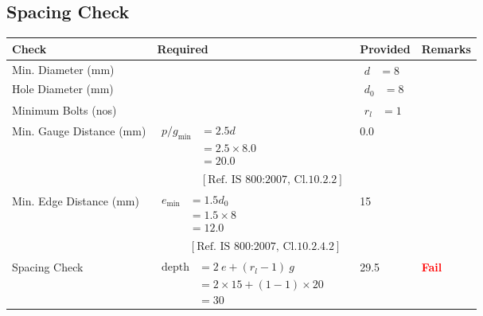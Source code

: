 \documentclass{article}%
\begin{document}
\subsection{Spacing Check}%
\label{subsec:SpacingCheck}%
\renewcommand{\arraystretch}{1.2}%
\begin{longtable}{|p{2.5cm}|p{7.5cm}|p{3cm}|p{2.5cm}|}%
\hline%
\rowcolor{OsdagGreen}%
Check&Required&Provided&Remarks\\%
\hline%
\endhead%
\hline%
Min. Diameter (mm)&&$\begin{aligned} d &=8 \end{aligned}$&\textcolor{OsdagGreen}{ 
\textbf{}
}\\%
\hline%
Hole Diameter (mm)& &$\begin{aligned} d_0 &=8 \end{aligned}$&\textcolor{OsdagGreen}{ 
\textbf{}
}\\%
\hline%
Minimum Bolts (nos)& &$\begin{aligned} r_l &=1 \end{aligned}$&\textcolor{OsdagGreen}{ 
\textbf{}
}\\%
\hline%
Min. Gauge Distance (mm)&$\begin{aligned} p/g_{\min}&= 2.5 d\\ &=2.5 \times8.0\\&=20.0\\ \\ & [\text{Ref. IS 800:2007, Cl.10.2.2}] \end{aligned}$&0.0&\textcolor{OsdagGreen}{ 
\textbf{}
}\\%
\hline%
Min. Edge Distance (mm)&$\begin{aligned}e_{\min} &= 1.5 d_0 \\ &= 1.5\times8\\ &=12.0\\ \\ & [\text{Ref. IS 800:2007, Cl.10.2.4.2}] \end{aligned}$&15&\textcolor{OsdagGreen}{ 
\textbf{}
}\\%
\hline%
Spacing Check&$\begin{aligned} \text{depth} & = 2~e + (r_l -1)~g\\ & = 2 \times 15+(1-1)\times20\\ & = 30\end{aligned}$&29.5&\textcolor{Red}{ 
\textbf{Fail}
}\\%
\hline%
\end{longtable}

%
%
\end{document}
